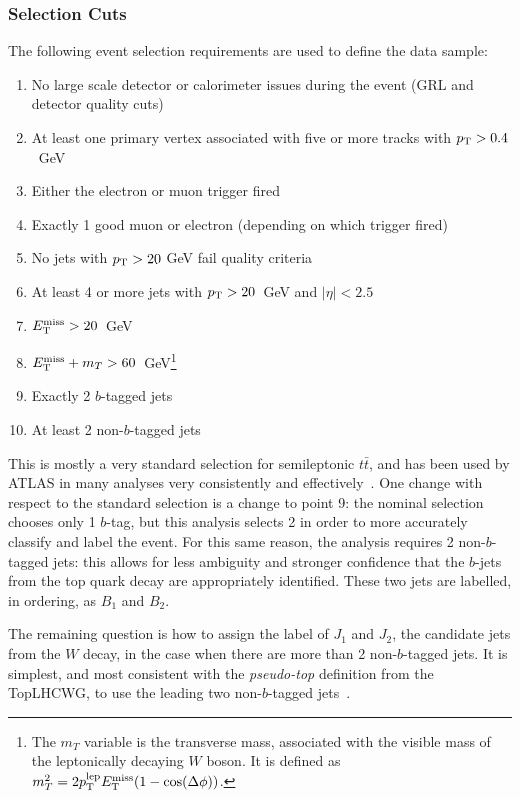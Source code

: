\subsubsection{Selection Cuts}

The following event selection requirements are used to define the data sample:
%
\begin{enumerate}
\item No large scale detector or calorimeter issues during the event (GRL and detector quality cuts)
\item At least one primary vertex associated with five or more tracks with $p_{\text{T}} > 0.4$~GeV
\item Either the electron or muon trigger fired
\item Exactly 1 good muon or electron (depending on which trigger fired)
\item No jets with $p_{\text{T}} > 20$ GeV fail quality criteria
\item At least 4 or more jets with $p_{\text{T}} > 20$~GeV and $|\eta| < 2.5$
\item $E_{\text{T}}^{\text{miss}} > 20$~GeV
\item $E_{\text{T}}^{\text{miss}} + m_T > 60$~GeV\footnote{The $m_T$ variable is the transverse mass, associated with the visible mass of the leptonically decaying $W$ boson. It is defined as $m_T^2 = 2 p_{\text{T}}^{\mathrm{lep}} E_{\text{T}}^{\text{miss}} (1 - \cos(\Delta \phi))$.}
\item Exactly 2 $b$-tagged jets
\item At least 2 non-$b$-tagged jets
\end{enumerate}
%
This is mostly a very standard selection for semileptonic $t\bar{t}$, and has been used by ATLAS in many analyses very consistently and effectively~\cite{Aad:2015fna,ATLAS-CONF-2012-149}. One change with respect to the standard selection is a change to point 9: the nominal selection chooses only 1 $b$-tag, but this analysis selects 2 in order to more accurately classify and label the event. For this same reason, the analysis requires 2 non-$b$-tagged jets: this allows for less ambiguity and stronger confidence that the $b$-jets from the top quark decay are appropriately identified. These two jets are labelled, in \pt ordering, as $B_1$ and $B_2$.


The remaining question is how to assign the label of $J_1$ and $J_2$, the candidate jets from the $W$ decay, in the case when there are more than 2 non-$b$-tagged jets. It is simplest, and most consistent with the \textit{pseudo-top} definition from the {\sc TopLHCWG}, to use the leading two non-$b$-tagged jets~\cite{pseudotop,Aad:2015eia}.

